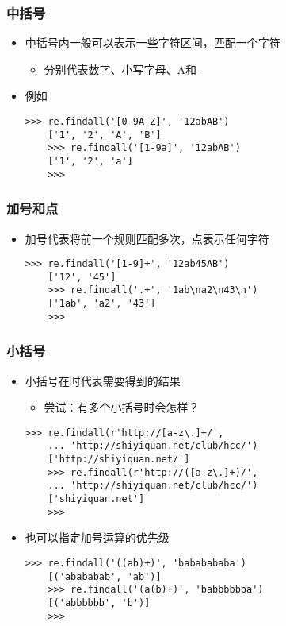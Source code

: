 \begin{CJK}{UTF8}{gbsn}
\begin{frame} [fragile]
	\frametitle{中括号}
	\linespread{1.5}
	\begin{itemize}
	\item 中括号内一般可以表示一些字符区间，匹配一个字符
		\begin{itemize}
		\item \inlineListing{[0-9a-zA\-]} 分别代表数字、小写字母、A和-
		\end{itemize}
	\item 例如
	\begin{lstlisting}[style=pythonstyle, gobble=4, texcl]
	>>> re.findall('[0-9A-Z]', '12abAB')
	['1', '2', 'A', 'B']
	>>> re.findall('[1-9a]', '12abAB')
	['1', '2', 'a']
	>>>
	\end{lstlisting}
	\end{itemize}
\end{frame}

\begin{frame} [fragile]
	\frametitle{加号和点}
	\linespread{1.25}
	\begin{itemize}
	\item 加号代表将前一个规则匹配多次，点表示任何字符
	\begin{lstlisting}[style=pythonstyle, gobble=4, texcl]
	>>> re.findall('[1-9]+', '12ab45AB')
	['12', '45']
	>>> re.findall('.+', '1ab\na2\n43\n')
	['1ab', 'a2', '43']
	>>>
	\end{lstlisting}
	\end{itemize}
\end{frame}

\begin{frame} [fragile]
	\frametitle{小括号}
	\begin{itemize}
	\item 小括号在时代表需要得到的结果
		\begin{itemize}
		\item 尝试：有多个小括号时会怎样？
		\end{itemize}
	\begin{lstlisting}[style=pythonstyle, gobble=4, texcl]
	>>> re.findall(r'http://[a-z\.]+/',
	... 'http://shiyiquan.net/club/hcc/')
	['http://shiyiquan.net/']
	>>> re.findall(r'http://([a-z\.]+)/',
	... 'http://shiyiquan.net/club/hcc/')
	['shiyiquan.net']
	>>>
	\end{lstlisting}
	\item 也可以指定加号运算的优先级
	\begin{lstlisting}[style=pythonstyle, gobble=4, texcl]
	>>> re.findall('((ab)+)', 'bababababa')
	[('abababab', 'ab')]
	>>> re.findall('(a(b)+)', 'babbbbbba')
	[('abbbbbb', 'b')]
	>>>
	\end{lstlisting}
	\end{itemize}
\end{frame}


\end{CJK}
